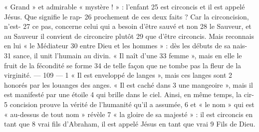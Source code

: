 « Grand » et admirable « mystère ! » : l'enfant	 
25	 	est circoncis et il est appelé Jésus. Que signifie le rap-	 
26	 	prochement de ces deux faits ? Car la circoncision, n'est-	 
27	 	ce pas, concerne celui qui a besoin d'être sauvé et non	 
28	 	le Sauveur, et au Sauveur il convient de circoncire plutôt	 
29	 	que d'être circoncis. Mais reconnais en lui « le Médiateur	 
30	 	entre Dieu et les hommes » : dès les débuts de sa nais-	 
31	 	sance, il unit l'humain au divin. « Il naît d'une	 
33	 	femme », mais en elle le fruit de la fécondité se forme	 
34	 	de telle façon que ne tombe pas la fleur de la virginité.	 
 	--- 109 ---	 
1	 	« Il est enveloppé de langes », mais ces langes sont	 
2	 	honorés par les louanges des anges. « Il est caché dans	 
3	 	une mangeoire », mais il est manifesté par une étoile	 
4	 	qui brille dans le ciel. Ainsi, en même temps, la cir-	 
5	 	concision prouve la vérité de l'humanité qu'il a assumée,	 
6	 	et « le nom » qui est « au-dessus de tout nom » révèle	 
7	 	« la gloire de sa majesté » : il est circoncis en tant que	 
8	 	vrai fils d'Abraham, il est appelé Jésus en tant que vrai	 
9	 	Fils de Dieu.